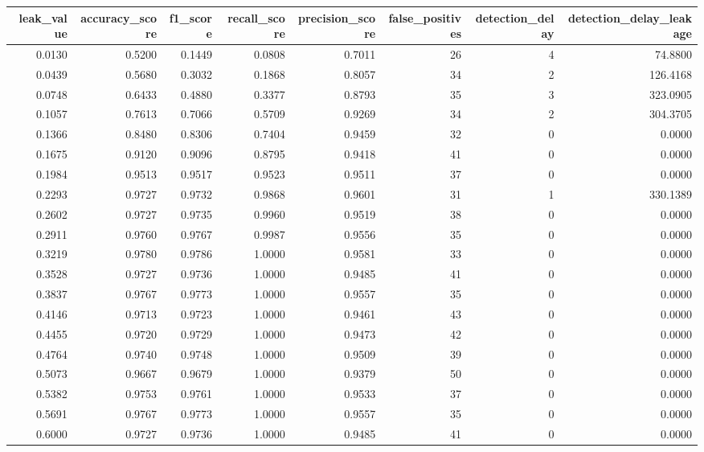 \begin{tabular}{rrrrrrrr}
\toprule
leak\_value & accuracy\_score & f1\_score & recall\_score & precision\_score & false\_positives & detection\_delay & detection\_delay\_leakage \\
\midrule
0.0130 & 0.5200 & 0.1449 & 0.0808 & 0.7011 & 26 & 4 & 74.8800 \\
0.0439 & 0.5680 & 0.3032 & 0.1868 & 0.8057 & 34 & 2 & 126.4168 \\
0.0748 & 0.6433 & 0.4880 & 0.3377 & 0.8793 & 35 & 3 & 323.0905 \\
0.1057 & 0.7613 & 0.7066 & 0.5709 & 0.9269 & 34 & 2 & 304.3705 \\
0.1366 & 0.8480 & 0.8306 & 0.7404 & 0.9459 & 32 & 0 & 0.0000 \\
0.1675 & 0.9120 & 0.9096 & 0.8795 & 0.9418 & 41 & 0 & 0.0000 \\
0.1984 & 0.9513 & 0.9517 & 0.9523 & 0.9511 & 37 & 0 & 0.0000 \\
0.2293 & 0.9727 & 0.9732 & 0.9868 & 0.9601 & 31 & 1 & 330.1389 \\
0.2602 & 0.9727 & 0.9735 & 0.9960 & 0.9519 & 38 & 0 & 0.0000 \\
0.2911 & 0.9760 & 0.9767 & 0.9987 & 0.9556 & 35 & 0 & 0.0000 \\
0.3219 & 0.9780 & 0.9786 & 1.0000 & 0.9581 & 33 & 0 & 0.0000 \\
0.3528 & 0.9727 & 0.9736 & 1.0000 & 0.9485 & 41 & 0 & 0.0000 \\
0.3837 & 0.9767 & 0.9773 & 1.0000 & 0.9557 & 35 & 0 & 0.0000 \\
0.4146 & 0.9713 & 0.9723 & 1.0000 & 0.9461 & 43 & 0 & 0.0000 \\
0.4455 & 0.9720 & 0.9729 & 1.0000 & 0.9473 & 42 & 0 & 0.0000 \\
0.4764 & 0.9740 & 0.9748 & 1.0000 & 0.9509 & 39 & 0 & 0.0000 \\
0.5073 & 0.9667 & 0.9679 & 1.0000 & 0.9379 & 50 & 0 & 0.0000 \\
0.5382 & 0.9753 & 0.9761 & 1.0000 & 0.9533 & 37 & 0 & 0.0000 \\
0.5691 & 0.9767 & 0.9773 & 1.0000 & 0.9557 & 35 & 0 & 0.0000 \\
0.6000 & 0.9727 & 0.9736 & 1.0000 & 0.9485 & 41 & 0 & 0.0000 \\
\bottomrule
\end{tabular}
